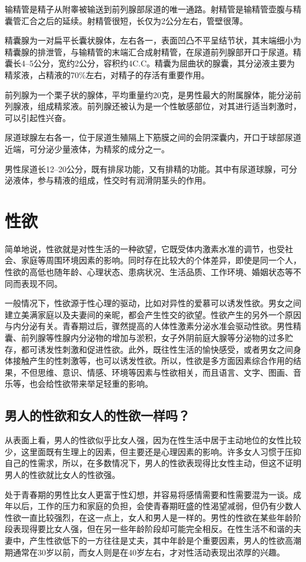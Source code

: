 \documentclass[12pt,UTF8]{ctexbook}
\begin{document}
输精管是精子从附睾被输送到前列腺部尿道的唯一通路。射精管是输精管壶腹与精囊管汇合之后的延续。射精管很短，长仅为2公分左右，管壁很薄。

精囊腺为一对扁平长囊状腺体，左右各一，表面凹凸不平呈结节状，其末端细小为精囊腺的排泄管，与输精管的末端汇合成射精管，在尿道前列腺部开口于尿道。精囊长4--5公分，宽约2公分，容积约4C.C。精囊为屈曲状的腺囊，其分泌液主要为精浆液，占精液的70\%左右，对精子的存活有重要作用。

前列腺为一个栗子状的腺体，平均重量约20克，是男性最大的附属腺体，能分泌前列腺液，组成精浆液。前列腺还被认为是一个性敏感部位，对其进行适当刺激时，可以引起性兴奋。

尿道球腺左右各一，位于尿道生殖隔上下筋膜之间的会阴深囊内，开口于球部尿道近端，可分泌少量液体，为精浆的成分之一。

男性尿道长12--20公分，既有排尿功能，又有排精的功能。其中有尿道球腺，可分泌液体，参与精液的组成，性交时有润滑阴茎头的作用。

\part{性欲}

简单地说，性欲就是对性生活的一种欲望，它既受体内激素水准的调节，也受社会、家庭等周围环境因素的影响。同时存在比较大的个体差异，即使是同一个人，性欲的高低也随年龄、心理状态、患病状况、生活品质、工作环境、婚姻状态等不同而表现不同。

一般情况下，性欲源于性心理的驱动，比如对异性的爱慕可以诱发性欲。男女之间建立美满家庭以及夫妻间的亲昵，都会产生性交的欲望。性欲产生的另外一个原因与内分泌有关。青春期过后，骤然提高的人体性激素分泌水准会驱动性欲。男性精囊、前列腺等性腺内分泌物的增加与淤积，女子外阴前庭大腺等分泌物的过多贮存，都可诱发性刺激和促进性欲。此外，既往性生活的愉快感受，或者男女之间身体接触产生的性刺激等，也可以诱发性欲。所以，性欲是多方面因素综合作用的结果，不但思维、意识、情感、环境等因素与性欲相关，而且语言、文字、图画、音乐等，也会给性欲带来举足轻重的影响。

\chapter{男人的性欲和女人的性欲一样吗？}

从表面上看，男人的性欲似乎比女人强，因为在性生活中居于主动地位的女性比较少，这里面既有生理上的因素，但主要还是心理因素的影响。许多女人习惯于压抑自己的性需求，所以，在多数情况下，男人的性欲表现得比女性主动，但这不证明男人的性欲就比女人的性欲强。

处于青春期的男性比女人更富于性幻想，并容易将感情需要和性需要混为一谈。成年以后，工作的压力和家庭的负担，会使青春期旺盛的性渴望减弱，但仍有少数人性欲一直比较强烈，在这一点上，女人和男人是一样的。男性的性欲在某些年龄阶段表现得要比女人强，但在另一些年龄阶段却可能完全相反。在性生活不和谐的夫妻中，产生性欲低下的一方往往是丈夫，其中年龄是个重要因素，男人的性欲高潮期通常在30岁以前，而女人则是在40岁左右，才对性活动表现出浓厚的兴趣。
\end{document}
